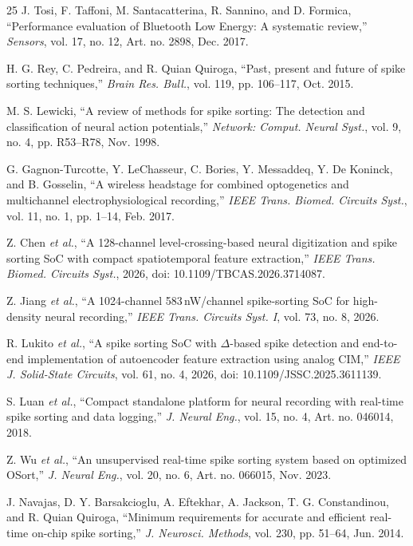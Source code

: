 \documentclass[11pt]{article}
\begin{document}
\begin{thebibliography}{25}
 J. Tosi, F. Taffoni, M. Santacatterina, R. Sannino, and D. Formica, ``Performance evaluation of Bluetooth Low Energy: A systematic review,'' \emph{Sensors}, vol. 17, no. 12, Art. no. 2898, Dec. 2017.

 H. G. Rey, C. Pedreira, and R. Quian Quiroga, ``Past, present and future of spike sorting techniques,'' \emph{Brain Res. Bull.}, vol. 119, pp. 106--117, Oct. 2015.

 M. S. Lewicki, ``A review of methods for spike sorting: The detection and classification of neural action potentials,'' \emph{Network: Comput. Neural Syst.}, vol. 9, no. 4, pp. R53--R78, Nov. 1998.

 G. Gagnon-Turcotte, Y. LeChasseur, C. Bories, Y. Messaddeq, Y. De Koninck, and B. Gosselin, ``A wireless headstage for combined optogenetics and multichannel electrophysiological recording,'' \emph{IEEE Trans. Biomed. Circuits Syst.}, vol. 11, no. 1, pp. 1--14, Feb. 2017.

 Z. Chen \emph{et al.}, ``A 128-channel level-crossing-based neural digitization and spike sorting SoC with compact spatiotemporal feature extraction,'' \emph{IEEE Trans. Biomed. Circuits Syst.}, 2026, doi: 10.1109/TBCAS.2026.3714087.

 Z. Jiang \emph{et al.}, ``A 1024-channel 583\,nW/channel spike-sorting SoC for high-density neural recording,'' \emph{IEEE Trans. Circuits Syst. I}, vol. 73, no. 8, 2026.

 R. Lukito \emph{et al.}, ``A spike sorting SoC with $\Delta$-based spike detection and end-to-end implementation of autoencoder feature extraction using analog CIM,'' \emph{IEEE J. Solid-State Circuits}, vol. 61, no. 4, 2026, doi: 10.1109/JSSC.2025.3611139.

 S. Luan \emph{et al.}, ``Compact standalone platform for neural recording with real-time spike sorting and data logging,'' \emph{J. Neural Eng.}, vol. 15, no. 4, Art. no. 046014, 2018.

 Z. Wu \emph{et al.}, ``An unsupervised real-time spike sorting system based on optimized OSort,'' \emph{J. Neural Eng.}, vol. 20, no. 6, Art. no. 066015, Nov. 2023.

 J. Navajas, D. Y. Barsakcioglu, A. Eftekhar, A. Jackson, T. G. Constandinou, and R. Quian Quiroga, ``Minimum requirements for accurate and efficient real-time on-chip spike sorting,'' \emph{J. Neurosci. Methods}, vol. 230, pp. 51--64, Jun. 2014.


\end{thebibliography}
\end{document}
